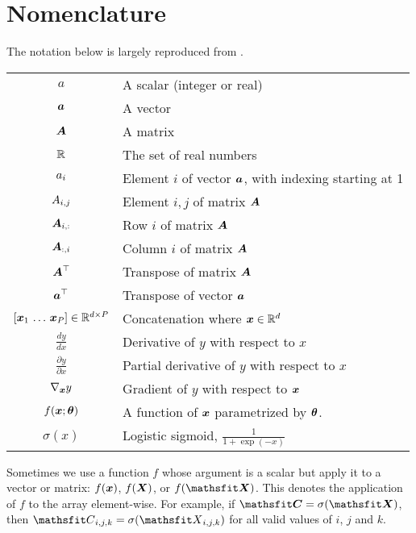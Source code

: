 \chapter{Nomenclature}
\label{section:Nomenclature}
The notation below is largely reproduced from \citet{Goodfellow-et-al-2016}.


\vspace{\notationgap}
\def\arraystretch{1.5}
\begin{tabular}{cp{3.25in}}
	$\displaystyle a$ & A scalar (integer or real)\\
	$\displaystyle {\bm{a}}$ & A vector\\
	$\displaystyle {\bm{A}}$ & A matrix\\
	$\displaystyle \mathbb{R}$ & The set of real numbers \\
	$\displaystyle {a}_i$ & Element $i$ of vector ${\bm{a}}$, with indexing starting at 1 \\
	$\displaystyle {A}_{i,j}$ & Element $i, j$ of matrix ${\bm{A}}$ \\
	$\displaystyle {\bm{A}}_{i, :}$ & Row $i$ of matrix ${\bm{A}}$ \\
	$\displaystyle {\bm{A}}_{:, i}$ & Column $i$ of matrix ${\bm{A}}$ \\
	$\displaystyle {\bm{A}}^\top$ & Transpose of matrix ${\bm{A}}$ \\
	$\displaystyle {\bm{a}}^\top$ & Transpose of vector ${\bm{a}}$ \\
	$[{\bm{x}}_1 \, \ldots \, {\bm{x}}_P] \in \mathbb{R}^{d \times P}$ & Concatenation where ${\bm{x}} \in \mathbb{R}^d$ \\
	$\frac{d y} {d x}$ & Derivative of $y$ with respect to $x$\\ [2ex]
	$\displaystyle \frac{\partial y} {\partial x} $ & Partial derivative of $y$ with respect to $x$ \\
	$\displaystyle \nabla_{\bm{x}} y $ & Gradient of $y$ with respect to ${\bm{x}}$ \\
	$\displaystyle f({\bm{x}} ; {\bm{\theta}}) $ & A function of ${\bm{x}}$ parametrized by ${\bm{\theta}}$. \\
	$\displaystyle \sigma(x)$ & Logistic sigmoid, $\displaystyle \frac{1} {1 + \exp(-x)}$ \\
\end{tabular}

Sometimes we use a function $f$ whose argument is a scalar but apply
it to a vector or matrix: $f({\bm{x}})$, $f({\bm{X}})$, or $f(\tX)$.
This denotes the application of $f$ to the
array element-wise. For example, if $\tC = \sigma(\tX)$, then $\etC_{i,j,k} = \sigma(\etX_{i,j,k})$
for all valid values of $i$, $j$ and $k$.